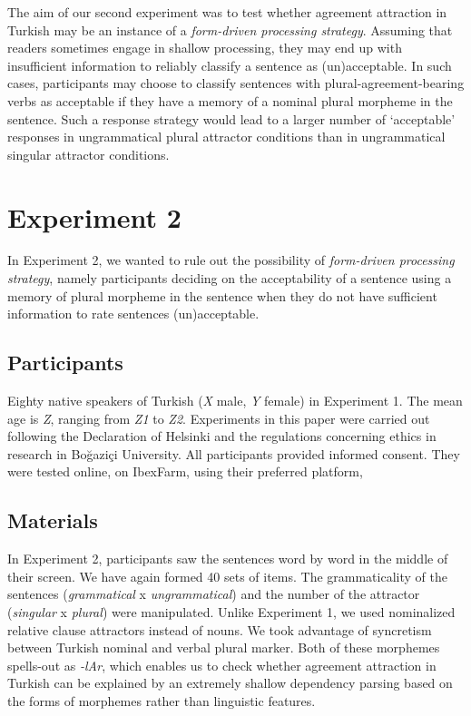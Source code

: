 \documentclass[doc,a4paper,man,natbib,floatsintext,noextraspace]{apa6}\usepackage[]{graphicx}\usepackage[]{color}
\begin{document}
The aim of our second experiment was to test whether agreement attraction in Turkish may be an instance of a \textit{form-driven processing strategy}. Assuming that readers sometimes engage in shallow processing, they may end up with insufficient information to reliably classify a sentence as (un)acceptable. In such cases, participants may choose to classify sentences with plural-agreement-bearing verbs as acceptable if they have a memory of a nominal plural morpheme in the sentence. Such a response strategy would lead to a larger number of ‘acceptable’ responses in ungrammatical plural attractor conditions than in ungrammatical singular attractor conditions. 



\section{Experiment 2} \label{sec:exp2}

In Experiment 2, we wanted to rule out the possibility of \textit{form-driven processing strategy}, namely participants deciding on the acceptability of a sentence using a memory of plural morpheme in the sentence when they do not have sufficient information to rate sentences (un)acceptable. 
 

\subsection{Participants} \label{sec:exp2:participants}

Eighty native speakers of Turkish (\textit{X} male, \textit{Y} female) in Experiment 1. The mean age is \textit{Z}, ranging from \textit{Z1} to \textit{Z2}. Experiments in this paper were carried out following the Declaration of Helsinki and the regulations concerning ethics in research in Bo\u{g}azi\c{c}i University. All participants provided informed consent. They were tested online, on IbexFarm, using their preferred platform, %

\subsection{Materials} \label{sec:exp2:materials}

In Experiment 2, participants saw the sentences word by word in the middle of their screen. We have again formed 40 sets of items. The grammaticality of the sentences (\textit{grammatical} x \textit{ungrammatical}) and the number of the attractor (\textit{singular} x \textit{plural}) were manipulated. Unlike Experiment 1, we used nominalized relative clause attractors instead of nouns. We took advantage of syncretism between Turkish nominal and verbal plural marker. Both of these morphemes spells-out as \textit{-lAr}, which enables us to check whether agreement attraction in Turkish can be explained by an extremely shallow dependency parsing based on the forms of morphemes rather than linguistic features.
\end{document}
